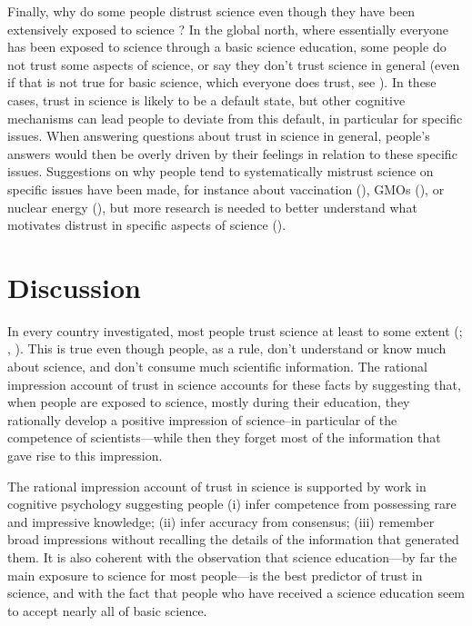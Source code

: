\documentclass[
  man,
  floatsintext,
  longtable,
  nolmodern,
  notxfonts,
  notimes,
  colorlinks=true,linkcolor=blue,citecolor=blue,urlcolor=blue]{apa7}
\begin{document}
Finally, why do some people distrust science even though they have been
extensively exposed to science ? In the global north, where essentially
everyone has been exposed to science through a basic science education,
some people do not trust some aspects of science, or say they don't
trust science in general (even if that is not true for basic science,
which everyone does trust, see
). In these cases, trust in science is likely to
be a default state, but other cognitive mechanisms can lead people to
deviate from this default, in particular for specific issues. When
answering questions about trust in science in general, people's answers
would then be overly driven by their feelings in relation to these
specific issues. Suggestions on why people tend to systematically
mistrust science on specific issues have been made, for instance about
vaccination
(), GMOs
(), or nuclear energy
(), but more research is needed to better understand what motivates
distrust in specific aspects of science
().

\section{Discussion}\label{discussion}

In every country investigated, most people trust science at least to
some extent (;
,
).
This is true even though people, as a rule, don't understand or know
much about science, and don't consume much scientific information. The
rational impression account of trust in science accounts for these facts
by suggesting that, when people are exposed to science, mostly during
their education, they rationally develop a positive impression of
science--in particular of the competence of scientists---while then they
forget most of the information that gave rise to this impression.

The rational impression account of trust in science is supported by work
in cognitive psychology suggesting people (i) infer competence from
possessing rare and impressive knowledge; (ii) infer accuracy from
consensus; (iii) remember broad impressions without recalling the
details of the information that generated them. It is also coherent with
the observation that science education---by far the main exposure to
science for most people---is the best predictor of trust in science, and
with the fact that people who have received a science education seem to
accept nearly all of basic science.
\end{document}
